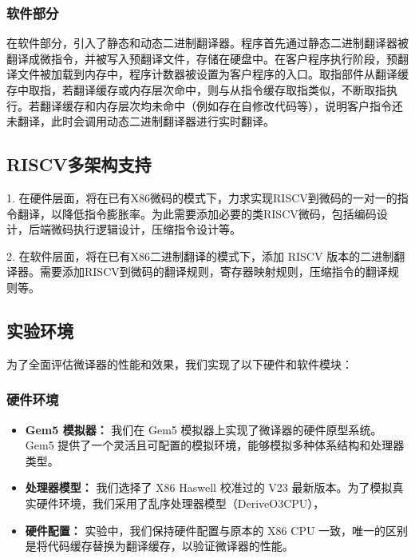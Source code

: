 \documentclass{Style/ucasproposal}%
\begin{document}
\subsubsection{软件部分}

在软件部分，引入了静态和动态二进制翻译器。程序首先通过静态二进制翻译器被翻译成微指令，并被写入预翻译文件，存储在硬盘中。在客户程序执行阶段，预翻译文件被加载到内存中，程序计数器被设置为客户程序的入口。取指部件从翻译缓存中取指，若翻译缓存或内存层次命中，则与从指令缓存取指类似，不断取指执行。若翻译缓存和内存层次均未命中（例如存在自修改代码等），说明客户指令还未翻译，此时会调用动态二进制翻译器进行实时翻译。


\subsection{RISCV多架构支持}

1. 在硬件层面，将在已有X86微码的模式下，力求实现RISCV到微码的一对一的指令翻译，以降低指令膨胀率。为此需要添加必要的类RISCV微码，包括编码设计，后端微码执行逻辑设计，压缩指令设计等。

2. 在软件层面，将在已有X86二进制翻译的模式下，添加 RISCV 版本的二进制翻译器。需要添加RISCV到微码的翻译规则，寄存器映射规则，压缩指令的翻译规则等。


\subsection{实验环境}

为了全面评估微译器的性能和效果，我们实现了以下硬件和软件模块：

\subsubsection{硬件环境}

\begin{itemize}
  \item \textbf{Gem5 模拟器：} 我们在 Gem5 模拟器\cite{Gem5SimulatorVersion2020}上实现了微译器的硬件原型系统。Gem5 提供了一个灵活且可配置的模拟环境，能够模拟多种体系结构和处理器类型。

  \item \textbf{处理器模型：} 我们选择了 X86 Haswell\cite{akramValidationGem5Simulator2019} 校准过的 V23 最新版本。为了模拟真实硬件环境，我们采用了乱序处理器模型（DeriveO3CPU），

  \item \textbf{硬件配置：} 实验中，我们保持硬件配置与原本的 X86 CPU 一致，唯一的区别是将代码缓存替换为翻译缓存，以验证微译器的性能。
\end{itemize}
\end{document}
